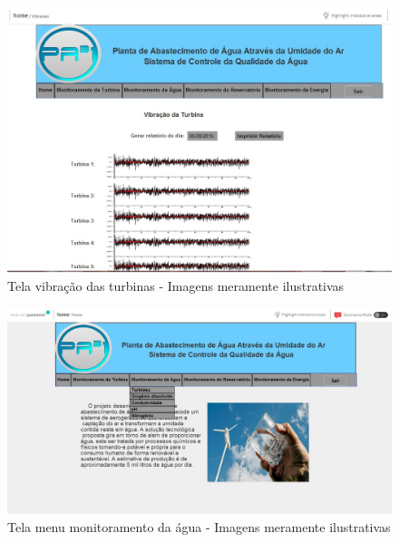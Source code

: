 \begin{center}
\begin{figure}[!ht]
\centering
\includegraphics[scale=0.5]{figuras/5}
\caption[Tela vibração das turbinas]{Tela vibração das turbinas - Imagens meramente ilustrativas}
\label{tela_vibracao_das_turbinas}
\end{figure}
\clearpage

\begin{figure}[!ht]
\centering
\includegraphics[scale=0.5]{figuras/menu_monitoramento_da_agua}
\caption[Tela menu monitoramento da água]{Tela menu monitoramento da água - Imagens meramente ilustrativas}
\label{menu_monitoramento_da_agua}
\end{figure}



\end{center}
